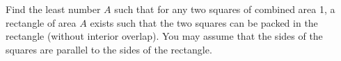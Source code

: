 Find the least number $A$ such that for any two squares of combined
area 1, a rectangle of area $A$ exists such that the two squares can
be packed in the rectangle (without interior overlap). You may assume
that the sides of the squares are parallel to the sides of the
rectangle.
